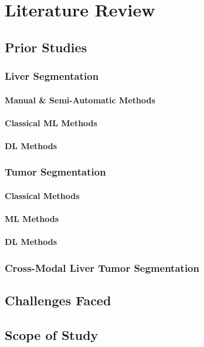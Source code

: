 \chapter{Literature Review}

\section{Prior Studies}

\subsection{Liver Segmentation}

\subsubsection{Manual \& Semi-Automatic Methods}

\subsubsection{Classical ML Methods}

\subsubsection{DL Methods}

\subsection{Tumor Segmentation}

\subsubsection{Classical Methods}

\subsubsection{ML Methods}

\subsubsection{DL Methods}

\subsection{Cross-Modal Liver Tumor Segmentation}

\section{Challenges Faced}

\section{Scope of Study}
